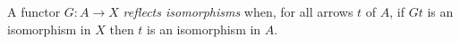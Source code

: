 A functor $G : A \to X$ \emph{reflects isomorphisms} when, for all arrows $t$ of $A$, if $G t$ is an isomorphism in $X$ then $t$ is an isomorphism in $A$.
